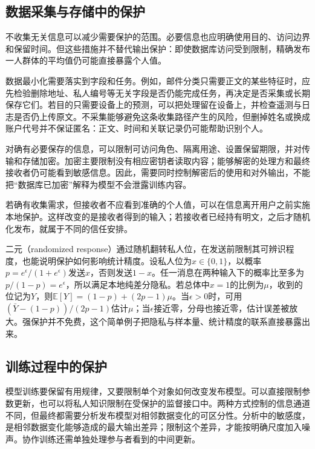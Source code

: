 \subsection{数据采集与存储中的保护}
\label{sec:privacy-collection}

不收集无关信息可以减少需要保护的范围。必要信息也应明确使用目的、访问边界和保留时间。但这些措施并不替代输出保护：即使数据库访问受到限制，精确发布一人群体的平均值仍可能直接暴露个人值。

数据最小化需要落实到字段和任务。例如，邮件分类只需要正文的某些特征时，应先检验删除地址、私人编号等无关字段是否仍能完成任务，再决定是否采集或长期保存它们。若目的只需要设备上的预测，可以把处理留在设备上，并检查遥测与日志是否仍上传原文。不采集能够避免这条收集路径产生的风险，但删掉姓名或换成账户代号并不保证匿名：正文、时间和关联记录仍可能帮助识别个人。

对确有必要保存的信息，可以限制可访问角色、隔离用途、设置保留期限，并对传输和存储加密。加密主要限制没有相应密钥者读取内容；能够解密的处理方和最终接收者仍可能看到敏感信息。因此，需要同时控制解密后的使用和对外输出，不能把“数据库已加密”解释为模型不会泄露训练内容。

若确有收集需求，但接收者不应看到准确的个人值，可以在信息离开用户之前实施本地保护。这样改变的是接收者得到的输入；若接收者已经持有明文，之后才随机化发布，就属于不同的信任安排。

二元（randomized response）通过随机翻转私人位，在发送前限制其可辨识程度，也能说明保护如何影响统计精度。设私人位为$x\in\{0,1\}$，以概率$p=e^\epsilon/(1+e^\epsilon)$发送$x$，否则发送$1-x$。任一消息在两种输入下的概率比至多为$p/(1-p)=e^\epsilon$，所以满足本地纯差分隐私。若总体中$x=1$的比例为$\mu$，收到的位记为$Y$，则$\mathbb E[Y]=(1-p)+(2p-1)\mu$。当$\epsilon>0$时，可用$(\bar Y-(1-p))/(2p-1)$估计$\mu$；当$\epsilon$接近零，分母也接近零，估计误差被放大。强保护并不免费，这个简单例子把隐私与样本量、统计精度的联系直接暴露出来。

\subsection{训练过程中的保护}
\label{sec:privacy-training-influence}
\label{sec:privacy-collaborative-computation}

模型训练要保留有用规律，又要限制单个对象如何改变发布模型。可以直接限制参数更新，也可以将私人知识限制在受保护的监督接口中。两种方式控制的信息通道不同，但最终都需要分析发布模型对相邻数据变化的可区分性。分析中的敏感度，是相邻数据变化能够造成的最大输出差异；限制这个差异，才能按明确尺度加入噪声。协作训练还需单独处理参与者看到的中间更新。

